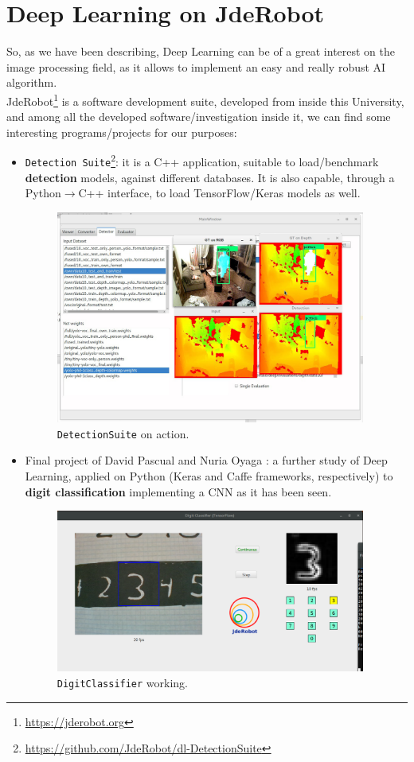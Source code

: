 \section{Deep Learning on JdeRobot}

So, as we have been describing, Deep Learning can be of a great interest on the image processing field, as it allows to implement an easy and really robust AI algorithm.\\

JdeRobot\footnote{\url{https://jderobot.org}} is a software development suite, developed from inside this University, and among all the developed software/investigation inside it, we can find some interesting programs/projects for our purposes:

\begin{itemize}
	\item \texttt{Detection Suite}\footnote{\url{https://github.com/JdeRobot/dl-DetectionSuite}}: it is a C++ application, suitable to load/benchmark \textbf{detection} models, against different databases. It is also capable, through a Python$\rightarrow$C++ interface, to load TensorFlow/Keras models as well.
	
	\begin{figure}[h]
		\centering
		\includegraphics[width=4in]{images/detection_suite_depth}
		\caption{\texttt{DetectionSuite} on action.}
		\label{fig:1_detectionsuite}
	\end{figure}

	\item Final project of David Pascual \cite{dpascualhe} and Nuria Oyaga \cite{noyaga}: a further study of Deep Learning, applied on Python (Keras and Caffe frameworks, respectively) to \textbf{digit classification} implementing a CNN as it has been seen.
	\begin{figure}[h]
		\centering
		\includegraphics[width=4in]{images/digitclassifier}
		\caption{\texttt{DigitClassifier} working.}
		\label{fig:1_digitclassifier}
	\end{figure}
	

\end{itemize}
